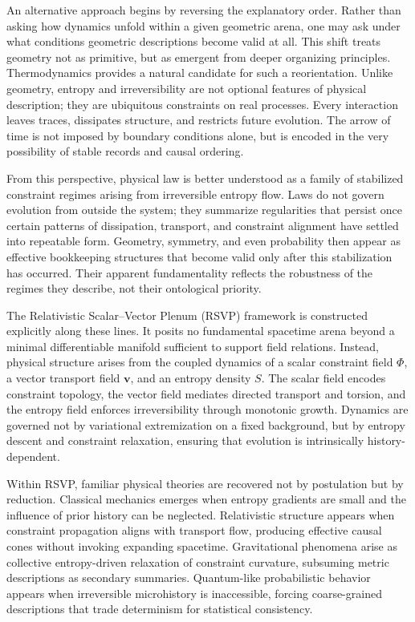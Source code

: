 \documentclass[11pt]{article}
\begin{document}
An alternative approach begins by reversing the explanatory order. Rather than asking how dynamics unfold within a given geometric arena, one may ask under what conditions geometric descriptions become valid at all. This shift treats geometry not as primitive, but as emergent from deeper organizing principles. Thermodynamics provides a natural candidate for such a reorientation. Unlike geometry, entropy and irreversibility are not optional features of physical description; they are ubiquitous constraints on real processes. Every interaction leaves traces, dissipates structure, and restricts future evolution. The arrow of time is not imposed by boundary conditions alone, but is encoded in the very possibility of stable records and causal ordering.

From this perspective, physical law is better understood as a family of stabilized constraint regimes arising from irreversible entropy flow. Laws do not govern evolution from outside the system; they summarize regularities that persist once certain patterns of dissipation, transport, and constraint alignment have settled into repeatable form. Geometry, symmetry, and even probability then appear as effective bookkeeping structures that become valid only after this stabilization has occurred. Their apparent fundamentality reflects the robustness of the regimes they describe, not their ontological priority.

The Relativistic Scalar--Vector Plenum (RSVP) framework is constructed explicitly along these lines. It posits no fundamental spacetime arena beyond a minimal differentiable manifold sufficient to support field relations. Instead, physical structure arises from the coupled dynamics of a scalar constraint field $\Phi$, a vector transport field $\mathbf{v}$, and an entropy density $S$. The scalar field encodes constraint topology, the vector field mediates directed transport and torsion, and the entropy field enforces irreversibility through monotonic growth. Dynamics are governed not by variational extremization on a fixed background, but by entropy descent and constraint relaxation, ensuring that evolution is intrinsically history-dependent.

Within RSVP, familiar physical theories are recovered not by postulation but by reduction. Classical mechanics emerges when entropy gradients are small and the influence of prior history can be neglected. Relativistic structure appears when constraint propagation aligns with transport flow, producing effective causal cones without invoking expanding spacetime. Gravitational phenomena arise as collective entropy-driven relaxation of constraint curvature, subsuming metric descriptions as secondary summaries. Quantum-like probabilistic behavior appears when irreversible microhistory is inaccessible, forcing coarse-grained descriptions that trade determinism for statistical consistency.
\end{document}
